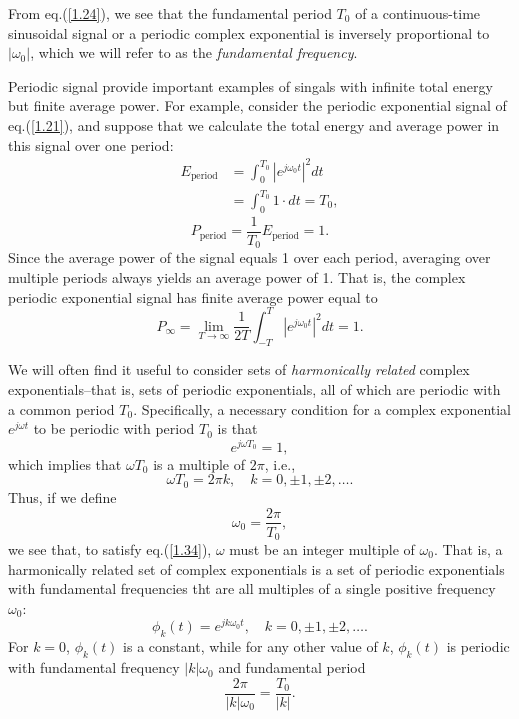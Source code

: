\documentclass[a4paper,10pt,twoside]{book}
\begin{document}
From eq.\;(\ref{1.24}), we see that the fundamental period $T_0$ of a continuous-time sinusoidal signal or a periodic complex exponential is inversely proportional to $|\omega_0|$, which we will refer to as the \textit{fundamental frequency}.

Periodic signal provide important examples of singals with infinite total energy but finite average power. For example, consider the periodic exponential signal of eq.\;(\ref{1.21}), and suppose that we calculate the total energy and average power in this signal over one period:
\begin{equation}
    \begin{aligned}E_{\mathrm{period}}&=\int_{0}^{T_{0}}\left|e^{j\omega_{0}t}\right|^{2}dt\\&=\int_{0}^{T_{0}}1\cdot dt = T_{0},\end{aligned}
    \label{1.30}
\end{equation}
\begin{equation}
    P_{\mathrm{period}}=\dfrac1{T_0}E_{\mathrm{period}}=1.
    \label{1.31}
\end{equation}
Since the average power of the signal equals 1 over each period, averaging over multiple periods always yields an average power of 1. That is, the complex periodic exponential signal has finite average power equal to
\begin{equation}
    P_{\infty} = \lim_{T\to\infty}\frac{1}{2T}\int_{-T}^{T}\left|e^{j\omega_{0}t}\right|^{2}dt = 1.
    \label{1.32}
\end{equation}

We will often find it useful to consider sets of \textit{harmonically related} complex exponentials--that is, sets of periodic exponentials, all of which are periodic with a common period $T_0$. Specifically, a necessary condition for a complex exponential $e^{j\omega t}$ to be periodic with period $T_0$ is that
\begin{equation}
    e^{j\omega T_0}=1,
    \label{1.33}
\end{equation}
which implies that $\omega T_0$ is a multiple of $2\pi$, i.e.,
\begin{equation}
    \omega T_{0} = 2\pi k,\quad k = 0,\pm1,\pm2,\ldots.
    \label{1.34}
\end{equation}
Thus, if we define
\begin{equation}
    \omega_0=\dfrac{2\pi}{T_0},
    \label{1.35}
\end{equation}
we see that, to satisfy eq.\;(\ref{1.34}), $\omega$ must be an integer multiple of $\omega_0$. That is, a harmonically related set of complex exponentials is a set of periodic exponentials with fundamental frequencies tht are all multiples of a single positive frequency $\omega_0$:
\begin{equation}
    \phi_{k}(t)=e^{jk\omega_{0}t},\quad k=0,\pm1,\pm2,\ldots.
    \label{1.36}
\end{equation}
For $k=0$, $\phi_k(t)$ is a constant, while for any other value of $k$, $\phi_k(t)$ is periodic with fundamental frequency $|k|\omega_0$ and fundamental period
\begin{equation}
    \dfrac{2\pi}{|k|\omega_0}=\dfrac{T_0}{|k|}.
    \label{1.37}
\end{equation}
\end{document}
